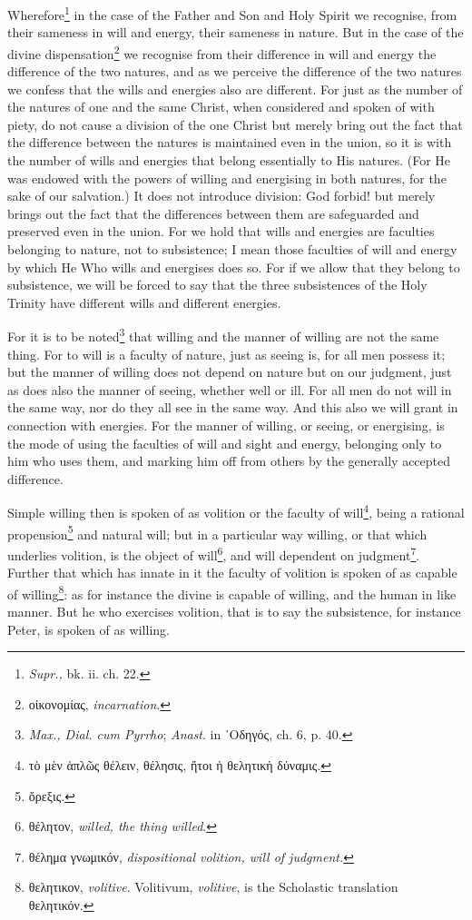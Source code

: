 Wherefore\footnote{\emph{Supr., }bk. ii. ch. 22.} in the case of the Father and Son and Holy Spirit we recognise, from their sameness in will and energy, their sameness in nature. But in the case of the divine dispensation\footnote{\textgreek{οἰκονομίας,} \emph{incarnation}.} we recognise from their difference in will and energy the difference of the two natures, and as we perceive the difference of the two natures we confess that the wills and energies also are different. For just as the number of the natures of one and the same Christ, when considered and spoken of with piety, do not cause a division of the one Christ but merely bring out the fact that the difference between the natures is maintained even in the union, so it is with the number of wills and energies that belong essentially to His natures. (For He was endowed with the powers of willing and energising in both natures, for the sake of our salvation.) It does not introduce division: God forbid! but merely brings out the fact that the differences between them are safeguarded and preserved even in the union. For we hold that wills and energies are faculties belonging to nature, not to subsistence; I mean those faculties of will and energy by which He Who wills and energises does so. For if we allow that they belong to subsistence, we will be forced to say that the three subsistences of the Holy Trinity have different wills and different energies.

For it is to be noted\footnote{\emph{Max., Dial. cum Pyrrho}; \emph{Anast}. in \textgreek{῾Οδηγός}, ch. 6, p. 40.} that willing and the manner of willing are not the same thing. For to will is a faculty of nature, just as seeing is, for all men possess it; but the manner of willing does not depend on nature but on our judgment, just as does also the manner of seeing, whether well or ill. For all men do not will in the same way, nor do they all see in the same way. And this also we will grant in connection with energies. For the manner of willing, or seeing, or energising, is the mode of using the faculties of will and sight and energy, belonging only to him who uses them, and marking him off from others by the generally accepted difference.

Simple willing then is spoken of as volition or the faculty of will\footnote{\textgreek{τὸ μὲν ἁπλῶς θέλειν, θέλησις, ἤτοι ἡ θελητικὴ δύναμις}.}, being a rational propension\footnote{\textgreek{ὄρεξις}.} and natural will; but in a particular way willing, or that which underlies volition, is the object of will\footnote{\textgreek{θέλητον}, \emph{willed, the thing willed}.}, and will dependent on judgment\footnote{\textgreek{θέλημα γνωμικόν,} \emph{dispositional volition, will of judgment.}}. Further that which has innate in it the faculty of volition is spoken of as capable of willing\footnote{\textgreek{θελητικον}, \emph{volitive}. Volitivum, \emph{volitive}, is the Scholastic translation \textgreek{θελητικόν.}}: as for instance the divine is capable of willing, and the human in like manner. But he who exercises volition, that is to say the subsistence, for instance Peter, is spoken of as willing.

